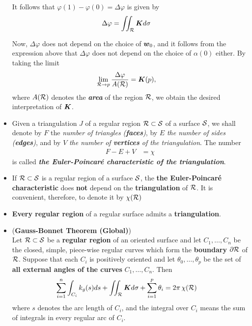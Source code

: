 \documentclass[11pt]{article}
\begin{document}
\begin{itemize}
\begin{remark}
It follows that $\varphi(1) - \varphi(0) = \Delta \varphi$ is given by
\begin{align}
 \Delta \varphi &= \iint_{{\mathcal R}}\boldsymbol{K}d\sigma \label{eqn: gaussian_curvature_angle_diff}
\end{align}

Now, $\Delta \varphi$ does not depend on the choice of $\boldsymbol{w}_0$, and it follows from the expression above that $\Delta \varphi$ does not depend on the choice of $\alpha(0)$ either. By taking the limit
\begin{align*}
\lim_{{\mathcal R} \rightarrow p}\frac{\Delta \varphi}{A({\mathcal R})} &= \boldsymbol{K}(p),
\end{align*} where $A({\mathcal R})$ denotes the \emph{\textbf{area}} of the region ${\mathcal R}$, we obtain the desired interpretation of $\boldsymbol{K}$.
\end{remark}

\item Given a triangulation $J$ of a regular region ${\mathcal R} \subset {\mathcal S}$  of a surface ${\mathcal S}$, we shall denote by $F$ the \emph{number of triangles (\textbf{faces})}, by $E$ \emph{the number of sides (\textbf{edges})}, and by $V$ \emph{the number of \textbf{vertices} of the triangulation}. The number
\begin{align*}
F - E + V &= \chi
\end{align*} is called \emph{\textbf{the Euler-Poincar\'e characteristic of the triangulation}}.

\item \begin{proposition}
If ${\mathcal R} \subset {\mathcal S}$ is a regular region of a surface ${\mathcal S}$, the \textbf{the Euler-Poincar\'e characteristic} does \textbf{not} depend on the \textbf{triangulation} of ${\mathcal R}$. It is convenient, therefore, to denote it by $\chi({\mathcal R})$
\end{proposition}

\item \begin{proposition}
\textbf{Every regular region} of a regular surface admits a \textbf{triangulation}.
\end{proposition}

\item \begin{theorem}\label{thm: gauss_bonnet_global} (\textbf{Gauss-Bonnet Theorem (Global)}) \citep{do1976differential}\\
Let ${\mathcal R} \subset {\mathcal S}$  be a \textbf{regular region} of an oriented surface and let $C_1,\ldots, C_n$ be the closed, simple, piece-wise regular curves which form the \textbf{boundary} $\partial {\mathcal R}$ of ${\mathcal R}$. Suppose that each $C_i$ is positively oriented and let $\theta_0,\ldots,\theta_p$ be the set of \textbf{all external angles of the curves} $C_1,\ldots, C_n$. Then
\begin{align}
\sum_{i=1}^{n}\int_{C_{i}}k_{g}(s)ds + \iint_{{\mathcal R}}\boldsymbol{K}d\sigma + \sum_{i=1}^{p}\theta_{i} &= 2\pi \,\chi({\mathcal R}) \label{eqn: gauss_bonnet_global}
\end{align} where $s$ denotes the arc length of $C_i$, and the integral over $C_i$ means the sum of integrals in every regular arc of $C_i$.
\end{theorem}


\end{itemize}
\end{document}
